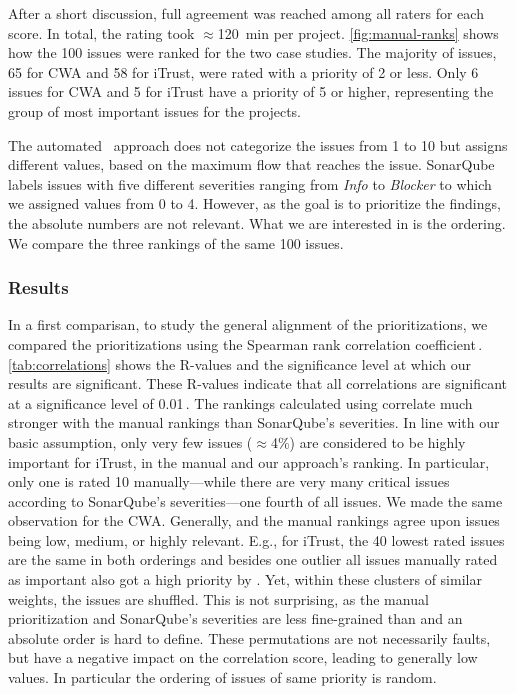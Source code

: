After a short discussion, full agreement was reached among all raters for each score.
In total, the rating took $\approx$120~min per project.
\autoref{fig:manual-ranks} shows how the 100 issues were ranked for the two case studies.
The majority of issues, 65 for CWA and 58 for iTrust, were rated with a priority of 2 or less. Only 6 issues for CWA and 5 for iTrust have a priority of 5 or higher, representing the group of most important issues for the projects.


The automated \appr\ approach does not categorize the issues from 1 to 10 but assigns different values, based on the maximum flow that reaches the issue.
SonarQube labels issues with five different severities ranging from \textit{Info} to \textit{Blocker} to which we assigned values from 0 to 4.
However, as the goal is to prioritize the findings, the absolute numbers are not relevant.
What we are interested in is the ordering. We compare the three rankings of the same 100 issues.

\subsubsection{Results}
%
In a first comparisan, to study the general alignment of the prioritizations, we compared the prioritizations using the Spearman rank correlation coefficient\,\cite{10.2307/1412159}.
\autoref{tab:correlations} shows the %
R-values and the significance level at which our results are significant.
These R-values indicate that all correlations are significant at a significance level of 0.01\,\cite{Whitlock2008ABD}.
The rankings calculated using \appr{} correlate much stronger with the manual rankings than SonarQube's severities.
In line with our basic assumption,  only very few issues ($\approx$4\%) are considered to be highly important for iTrust, in the manual and our approach's ranking. In particular, only one is rated 10 manually---while there are very many critical issues according to SonarQube's severities---one fourth of all issues.
We made the same observation for the CWA.
Generally, \appr{} and the manual rankings agree upon issues being low, medium, or highly relevant.
E.g., for iTrust, the 40 lowest rated issues are the same in both orderings and besides one outlier all issues manually rated as important also got a high priority by \appr.
Yet, within these clusters of similar weights, the issues are shuffled. %
This is not surprising, as the manual prioritization and SonarQube's severities are less fine-grained than \appr{} and an absolute order is hard to define.
These permutations are not necessarily faults, but have a negative impact on the correlation score, leading to generally low values.
In particular the ordering of issues of same priority is random.


